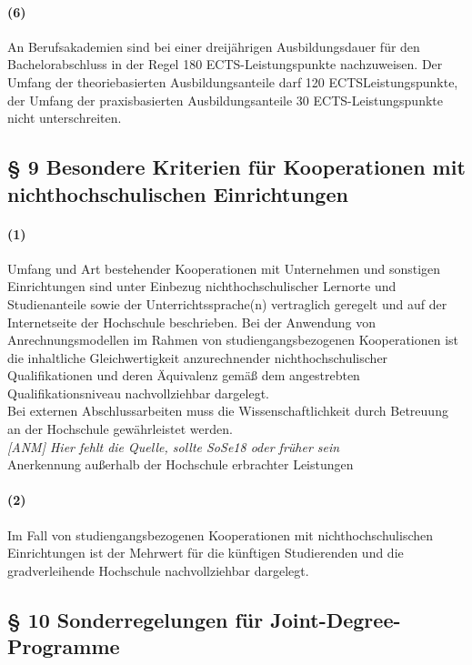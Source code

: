 \documentclass[a4paper]{scrartcl}
\begin{document}
\paragraph{(6)} An Berufsakademien sind bei einer dreijährigen Ausbildungsdauer für den Bachelorabschluss in der Regel 180 ECTS-Leistungspunkte nachzuweisen. Der Umfang der theoriebasierten Ausbildungsanteile darf 120 ECTSLeistungspunkte, der Umfang der praxisbasierten Ausbildungsanteile 30 ECTS-Leistungspunkte nicht unterschreiten.
\subsection{§ 9 Besondere Kriterien für Kooperationen mit nichthochschulischen
Einrichtungen}
\paragraph{(1)} Umfang und Art bestehender Kooperationen mit Unternehmen und sonstigen Einrichtungen sind unter Einbezug nichthochschulischer Lernorte und Studienanteile sowie der Unterrichtssprache(n) vertraglich geregelt und auf der Internetseite der Hochschule beschrieben. Bei der Anwendung von Anrechnungsmodellen im Rahmen von studiengangsbezogenen Kooperationen ist die inhaltliche Gleichwertigkeit anzurechnender nichthochschulischer Qualifikationen und deren Äquivalenz gemäß dem angestrebten Qualifikationsniveau nachvollziehbar dargelegt.\\

\textcolor{Bernd}{\textbf{\cite{finde ich nicht; sollte SoSe18 oder früher sein}} Bei externen Abschlussarbeiten muss die Wissenschaftlichkeit durch Betreuung an der Hochschule gewährleistet werden.}\\

\textcolor{Brutus}{\emph{[ANM] Hier fehlt die Quelle, sollte SoSe18 oder früher sein}}\\

\textcolor{Bernd}{\textbf{\cite{PROT: WiSe2015-RL}} Anerkennung außerhalb der Hochschule erbrachter Leistungen}\\

\paragraph{(2)} Im Fall von studiengangsbezogenen Kooperationen mit nichthochschulischen Einrichtungen ist der Mehrwert für die künftigen Studierenden und die gradverleihende Hochschule nachvollziehbar dargelegt.
\subsection{§ 10 Sonderregelungen für Joint-Degree-Programme}
\end{document}
